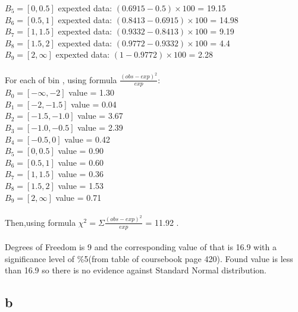 \documentclass[11pt]{article}
\begin{document}
$B_5=[0,0.5]$ expexted data: $(0.6915-0.5)\times100$ = 19.15\\

$B_6=[0.5,1]$ expexted data: $(0.8413-0.6915)\times100$ = 14.98\\

$B_7=[1,1.5]$ expexted data: $(0.9332-0.8413)\times100$ = 9.19\\

$B_8=[1.5,2]$ expexted data: $(0.9772-0.9332)\times100$ = 4.4\\

$B_9=[2,\infty]$ expexted data: $(1-0.9772)\times100$ = 2.28\\\\
For each of bin , using formula $\frac{{(obs -exp)}^2}{exp}$:\\

$B_0=[-\infty,-2]$ value = 1.30\\

$B_1=[-2,-1.5]$ value = 0.04\\

$B_2=[-1.5,-1.0]$ value = 3.67\\

$B_3=[-1.0,-0.5]$ value = 2.39\\

$B_4=[-0.5,0]$ value = 0.42\\

$B_5=[0,0.5]$ value = 0.90\\

$B_6=[0.5,1]$ value = 0.60\\

$B_7=[1,1.5]$ value = 0.36\\

$B_8=[1.5,2]$ value = 1.53\\

$B_9=[2,\infty]$ value = 0.71\\\\

Then,using formula $\chi^2 = \Sigma \frac{{(obs -exp)}^2}{exp}$ = 11.92 .\\\\
Degrees of Freedom is 9  and the corresponding value of that is 16.9 with a significance level of \%5(from table of coursebook page 420). Found value is less than 16.9 so there is no evidence against Standard Normal distribution.


\subsection*{b}
\end{document}
